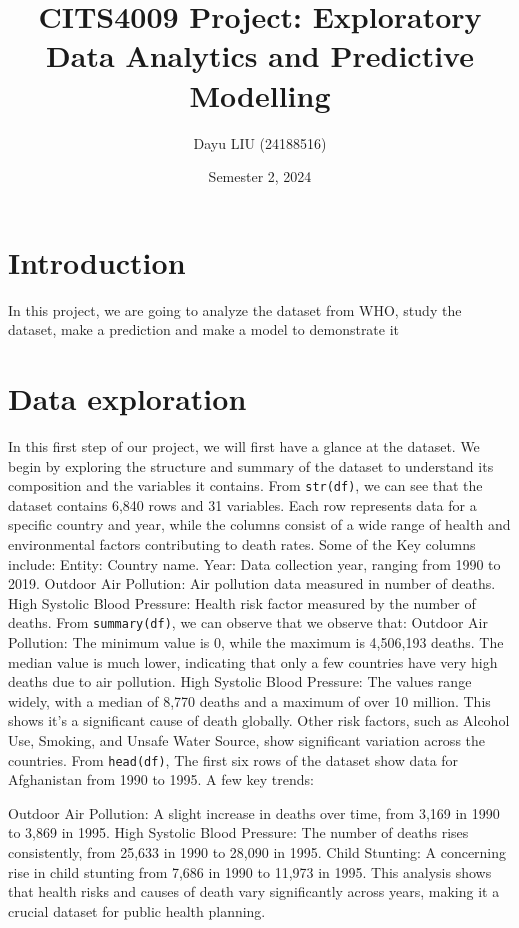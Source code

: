 \documentclass[
]{article}
\title{CITS4009 Project: Exploratory Data Analytics and Predictive
Modelling}
\author{Dayu LIU (24188516)}
\date{Semester 2, 2024}
\begin{document}
\maketitle

\section{Introduction}\label{introduction}

In this project, we are going to analyze the dataset from WHO, study the
dataset, make a prediction and make a model to demonstrate it
\vspace{0.5cm}

\section{Data exploration}\label{data-exploration}

In this first step of our project, we will first have a glance at the
dataset. We begin by exploring the structure and summary of the dataset
to understand its composition and the variables it contains. From
\texttt{str(df)}, we can see that the dataset contains 6,840 rows and 31
variables. Each row represents data for a specific country and year,
while the columns consist of a wide range of health and environmental
factors contributing to death rates. Some of the Key columns include:
Entity: Country name. Year: Data collection year, ranging from 1990 to
2019. Outdoor Air Pollution: Air pollution data measured in number of
deaths. High Systolic Blood Pressure: Health risk factor measured by the
number of deaths. From \texttt{summary(df)}, we can observe that we
observe that: Outdoor Air Pollution: The minimum value is 0, while the
maximum is 4,506,193 deaths. The median value is much lower, indicating
that only a few countries have very high deaths due to air pollution.
High Systolic Blood Pressure: The values range widely, with a median of
8,770 deaths and a maximum of over 10 million. This shows it's a
significant cause of death globally. Other risk factors, such as Alcohol
Use, Smoking, and Unsafe Water Source, show significant variation across
the countries. From \texttt{head(df)}, The first six rows of the dataset
show data for Afghanistan from 1990 to 1995. A few key trends:

Outdoor Air Pollution: A slight increase in deaths over time, from 3,169
in 1990 to 3,869 in 1995. High Systolic Blood Pressure: The number of
deaths rises consistently, from 25,633 in 1990 to 28,090 in 1995. Child
Stunting: A concerning rise in child stunting from 7,686 in 1990 to
11,973 in 1995. This analysis shows that health risks and causes of
death vary significantly across years, making it a crucial dataset for
public health planning.
\end{document}
